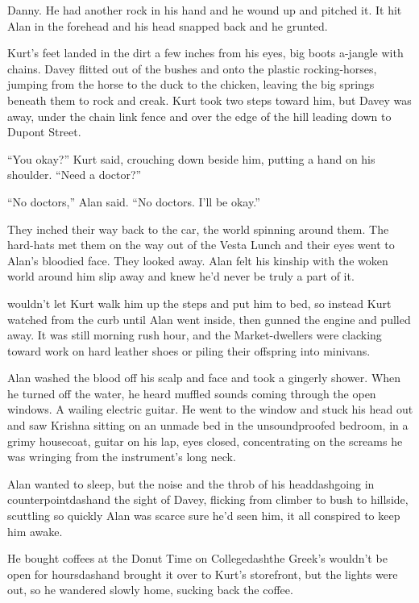 Danny.  He had another rock in his hand and he wound up and pitched
it.  It hit Alan in the forehead and his head snapped back and he
grunted.

Kurt's feet landed in the dirt a few inches from his eyes, big boots
a-jangle with chains.  Davey flitted out of the bushes and onto the
plastic rocking-horses, jumping from the horse to the duck to the
chicken, leaving the big springs beneath them to rock and creak.  Kurt
took two steps toward him, but Davey was away, under the chain link
fence and over the edge of the hill leading down to Dupont Street.

``You okay?'' Kurt said, crouching down beside him, putting a hand on
his shoulder.  ``Need a doctor?''

``No doctors,'' Alan said.  ``No doctors.  I'll be okay.''

They inched their way back to the car, the world spinning around them. 
The hard-hats met them on the way out of the Vesta Lunch and their
eyes went to Alan's bloodied face.  They looked away.  Alan felt his
kinship with the woken world around him slip away and knew he'd never
be truly a part of it.

 wouldn't let Kurt walk him up the steps and put him to bed, so
instead Kurt watched from the curb until Alan went inside, then gunned
the engine and pulled away.  It was still morning rush hour, and the
Market-dwellers were clacking toward work on hard leather shoes or
piling their offspring into minivans.

Alan washed the blood off his scalp and face and took a gingerly
shower.  When he turned off the water, he heard muffled sounds coming
through the open windows.  A wailing electric guitar.  He went to the
window and stuck his head out and saw Krishna sitting on an unmade bed
in the unsoundproofed bedroom, in a grimy housecoat, guitar on his
lap, eyes closed, concentrating on the screams he was wringing from
the instrument's long neck.

Alan wanted to sleep, but the noise and the throb of his headdash{}going
in counterpointdash{}and the sight of Davey, flicking from climber to
bush to hillside, scuttling so quickly Alan was scarce sure he'd seen
him, it all conspired to keep him awake.

He bought coffees at the Donut Time on Collegedash{}the Greek's wouldn't
be open for hoursdash{}and brought it over to Kurt's storefront, but the
lights were out, so he wandered slowly home, sucking back the coffee.


